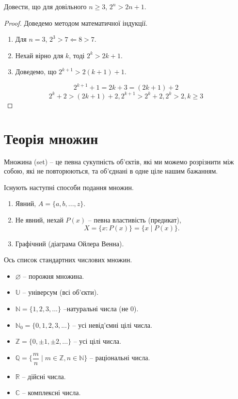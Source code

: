 \begin{example}
    Довести, що для довільного $n \geqslant 3$, $2^n > 2n + 1$.
    \begin{proof}
        Доведемо методом математичної індукції.
        
        \begin{enumerate}
            \item Для $n = 3$, $2^3 > 7 \Leftarrow 8 > 7$.
            \item Нехай вірно для $k$, тоді $2^k > 2k + 1$.
            \item Доведемо, що $2^{k+1} > 2(k+1) + 1$.
        \end{enumerate}
        $$2^{k+1} + 1 = 2k + 3 = (2k + 1) + 2$$
        $$2^k +2 > (2k + 1) + 2, 2^{k+1} > 2^k + 2, 2^k > 2, k \geqslant 3$$
    \end{proof}
\end{example}

\section{Теорія множин}

\begin{definition}[Множина]
    Множина (set) -- це певна сукупність об'єктів, які ми можемо розрізнити між собою, які не повторюються, та об'єднані в одне ціле нашим бажанням.
\end{definition}

Існують наступні способи подання множин.
\begin{enumerate}
    \item Явний, $A = \{a, b, ..., z\}$.
    \item Не явний, нехай $P(x)$ -- певна властивість (предикат),
        $$X = \{x: P(x)\} = \{x \mid P(x)\}.$$
    \item Графічний (діаграма Ойлера Венна).
\end{enumerate}

Ось список стандартних числових множин.
\begin{itemize}
    \item $\varnothing$ -- порожня множина.
    \item $\mathbb{U}$ -- універсум (всі об'єкти).
    \item $\mathbb{N} = \{1, 2, 3, ...\}$ --натуральні числа (не 0).
    \item $\mathbb{N}_0 = \{0, 1, 2, 3, ...\}$ -- усі невід'ємні цілі числа.
    \item $\mathbb{Z} = \{0, \pm 1, \pm 2, ...\}$ -- усі цілі числа.
    \item $\mathbb{Q} = \{\dfrac{m}{n} \mid m \in \mathbb{Z}, n \in \mathbb{N}\}$ -- раціональні числа.
    \item $\mathbb{R}$ -- дійсні числа.
    \item $\mathbb{C}$ -- комплексні числа.
\end{itemize}

